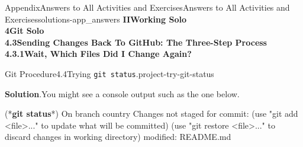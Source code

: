 \documentclass[oneside,10pt,]{book}
\newcommand{\blocktitlefont}{\relax}
\newcommand{\mono}[1]{\texttt{#1}}
\newcommand{\consoleinput}[1]{\textbf{#1}}
\begin{document}
\begin{solutions-chapter}{Appendix}{Answers to All Activities and Exercises}{}{Answers to All Activities and Exercises}{}{}{solutions-app_answers}
\noindent\textbf{\Large{}II\space\textperiodcentered\space{}Working Solo\\
4\space\textperiodcentered\space{}Git Solo\\
4.3\space\textperiodcentered\space{}Sending Changes Back To GitHub: The Three-Step Process\\
4.3.1\space\textperiodcentered\space{}Wait, Which Files Did I Change Again?}
\begin{projectsolution}{Git Procedure}{4.4}{Trying \mono{git status}.}{project-try-git-status}%
\par\smallskip%
\noindent\textbf{\blocktitlefont Solution}.\hypertarget{solution-try-git-status-c-back}{}\quad{}You might see a console output such as the one below.%
\begin{console}{0}{1}{0}
(*\consoleinput{git status}*)
On branch country
Changes not staged for commit:
  (use "git add <file>..." to update what will be committed)
  (use "git restore <file>..." to discard changes in working directory)
        modified:   README.md


\end{console}
\end{projectsolution}
\end{solutions-chapter}
\end{document}
